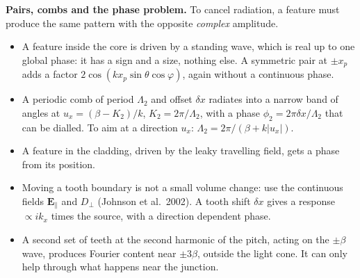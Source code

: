 \documentclass[11pt,a4paper]{article}
\begin{document}
\textbf{Pairs, combs and the phase problem.} To cancel radiation, a feature must produce the same pattern with the
opposite \emph{complex} amplitude.
\begin{itemize}\setlength{\itemsep}{1pt}
\item A feature inside the core is driven by a standing wave, which is real up to one global phase: it has a sign and
a size, nothing else. A symmetric pair at $\pm x_p$ adds a factor $2\cos(kx_p\sin\theta\cos\varphi)$, again without a
continuous phase.
\item A periodic comb of period $\Lambda_2$ and offset $\delta x$ radiates into a narrow band of angles at
$u_x=(\beta-K_2)/k$, $K_2=2\pi/\Lambda_2$, with a phase $\phi_2=2\pi\delta x/\Lambda_2$ that can be dialled. To aim at a
direction $u_x$: $\Lambda_2=2\pi/(\beta+k|u_x|)$.
\item A feature in the cladding, driven by the leaky travelling field, gets a phase from its position.
\item Moving a tooth boundary is not a small volume change: use the continuous fields $\mathbf E_\parallel$ and
$D_\perp$ (Johnson et al.\ 2002). A tooth shift $\delta x$ gives a response $\propto ik_x$ times the source, with a
direction dependent phase.
\item A second set of teeth at the second harmonic of the pitch, acting on the $\pm\beta$ wave, produces Fourier content
near $\pm3\beta$, outside the light cone. It can only help through what happens near the junction.
\end{itemize}
\end{document}
